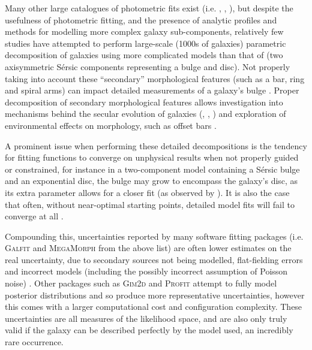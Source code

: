 \documentclass[../main.tex]{subfiles}
\begin{document}
Many other large catalogues of photometric fits exist (i.e. \citealt{2012MNRAS.421.2277L}, \citealt{2012MNRAS.421.1007K}, \citealt{2012ApJS..203...24V}), but despite the usefulness of photometric fitting, and the presence of analytic profiles and methods for modelling more complex galaxy sub-components, relatively few studies have attempted to perform large-scale (1000s of galaxies) parametric decomposition of galaxies using more complicated models than that of \citet{2011ApJS..196...11S} (two axisymmetric S\'ersic components representing a bulge and disc). Not properly taking into account these ``secondary'' morphological features (such as a bar, ring and spiral arms) can impact detailed measurements of a galaxy's bulge \citep{Gao2017:1709.00746v1}. Proper decomposition of secondary morphological features allows investigation into mechanisms behind the secular evolution of galaxies (\citealt{2015MNRAS.453.3729H}, \citealt{2018MNRAS.473.4731K}, \citealt{2018ApJ...862..100G}) and exploration of environmental effects on morphology, such as offset bars \citep{2017MNRAS.469.3363K}.

A prominent issue when performing these detailed decompositions is the tendency for fitting functions to converge on unphysical results when not properly guided or constrained, for instance in a two-component model containing a S\'ersic bulge and an exponential disc, the bulge may grow to encompass the galaxy's disc, as its extra parameter allows for a closer fit (as observed by \citealt{2018MNRAS.473.4731K}). It is also the case that often, without near-optimal starting points, detailed model fits will fail to converge at all \citep{2016MNRAS.462.1470L}.

Compounding this, uncertainties reported by many software fitting packages (i.e. \textsc{Galfit} and \textsc{MegaMorph} from the above list) are often lower estimates on the real uncertainty, due to secondary sources not being modelled, flat-fielding errors and incorrect models (including the possibly incorrect assumption of Poisson noise) \citep{2010AJ....139.2097P}. Other packages such as \textsc{Gim2d} and \textsc{Profit} attempt to fully model posterior distributions and so produce more representative uncertainties, however this comes with a larger computational cost and configuration complexity. These uncertainties are all measures of the likelihood space, and are also only truly valid if the galaxy can be described perfectly by the model used, an incredibly rare occurrence.
\end{document}
